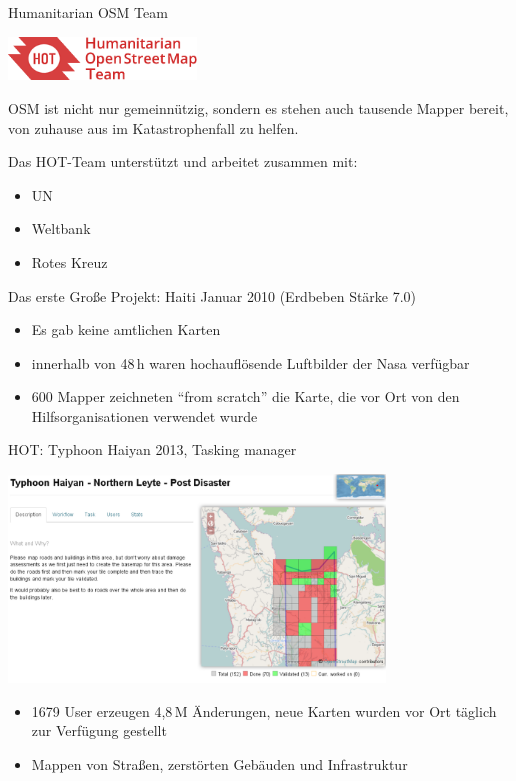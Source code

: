 \documentclass[handout]{beamer}
\begin{document}
\begin{frame}{Humanitarian OSM Team}

\vspace{-1.5cm}
\hfill \includegraphics[width=5cm]{hot.png}

OSM ist nicht nur gemeinnützig, sondern es stehen auch tausende Mapper bereit, von zuhause aus im Katastrophenfall zu helfen.
\vspace{0.1cm}

Das HOT-Team unterstützt und arbeitet zusammen mit:

\begin{itemize}
  \item UN
  \item Weltbank
  \item Rotes Kreuz
\end{itemize}

Das erste Große Projekt: Haiti Januar 2010 (Erdbeben Stärke 7.0)

\begin{itemize}
  \item Es gab keine amtlichen Karten
  \item innerhalb von 48\,h waren hochauflösende Luftbilder der Nasa verfügbar
  \item  600 Mapper zeichneten "`from scratch"' die Karte, die vor Ort von den Hilfsorganisationen verwendet wurde
\end{itemize}

\end{frame}

\begin{frame}{HOT: Typhoon Haiyan 2013, Tasking manager}

\includegraphics[width=10cm]{hot-task.png}

\begin{itemize}
  \item 1679 User erzeugen 4,8\,M Änderungen, neue Karten wurden vor Ort täglich zur Verfügung gestellt
  \item Mappen von Straßen, zerstörten Gebäuden und Infrastruktur
\end{itemize}

\end{frame}
\end{document}

